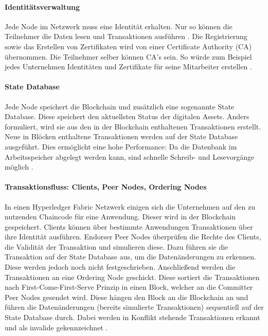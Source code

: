 \paragraph{Identitätsverwaltung}
Jede Node im Netzwerk muss eine Identität erhalten. Nur so können die Teilnehmer die Daten lesen und Transaktionen ausführen \cite{SchererPerformanceScalabilityBlockchain2017}. Die Registrierung sowie das Erstellen von Zertifikaten wird von einer Certificate Authority (CA) übernommen. Die Teilnehmer selber können CA's sein. So würde zum Beispiel jedes Unternehmen Identitäten und Zertifikate für seine Mitarbeiter erstellen \cite{HyperledgerFabricTeamCAHyperledgerFabric}.

\paragraph{State Database}
Jede Node speichert die Blockchain und zusätzlich eine sogenannte State Database. Diese speichert den aktuellsten Status der digitalen Assets. Anders formuliert, wird sie aus den in der Blockchain enthaltenen Transaktionen erstellt. Neue in Blöcken enthaltene Transaktionen werden auf der State Database ausgeführt. Dies ermöglicht eine hohe Performance: Da die Datenbank im Arbeitsspeicher abgelegt werden kann, sind schnelle Schreib- und Lesevorgänge möglich \cite{SchererPerformanceScalabilityBlockchain2017}.

\paragraph{Transaktionsfluss: Clients, Peer Nodes, Ordering Nodes}
In einen Hyperledger Fabric Netzwerk einigen sich die Unternehmen auf den zu nutzenden Chaincode für eine Anwendung. Dieser wird in der Blockchain gespeichert. Clients können über bestimmte Anwendungen Transaktionen über ihre Identität ausführen. Endorser Peer Nodes überprüfen die Rechte des Clients, die Validität der Transaktion und simulieren diese. Dazu führen sie die Transaktion auf der State Database aus, um die Datenänderungen zu erkennen. Diese werden jedoch noch nicht festgeschrieben. Anschließend werden die Transaktionen an eine Ordering Node geschickt. Diese sortiert die Transaktionen nach First-Come-First-Serve Prinzip in einen Block, welcher an die Committer Peer Nodes gesendet wird. Diese hängen den Block an die Blockchain an und führen die Datenänderungen (bereits simulierte Transaktionen) sequentiell auf der State Database durch. Dabei werden in Konflikt stehende Transaktionen erkannt und als invalide gekennzeichnet \cite{SchererPerformanceScalabilityBlockchain2017}.

